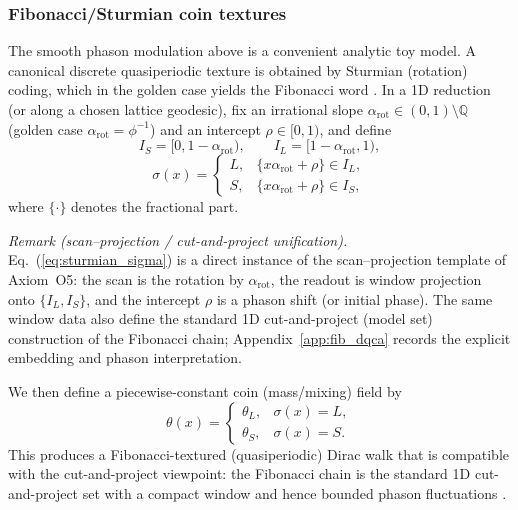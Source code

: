\subsubsection{Fibonacci/Sturmian coin textures}
The smooth phason modulation above is a convenient analytic toy model. A canonical discrete quasiperiodic texture is obtained by Sturmian (rotation) coding, which in the golden case yields the Fibonacci word \cite{MorseHedlund1940,Lothaire2002}. In a 1D reduction (or along a chosen lattice geodesic), fix an irrational slope $\alpha_{\mathrm{rot}}\in(0,1)\setminus\mathbb{Q}$ (golden case $\alpha_{\mathrm{rot}}=\phi^{-1}$) and an intercept $\rho\in[0,1)$, and define
\begin{equation}
    I_S=[0,1-\alpha_{\mathrm{rot}}),\qquad I_L=[1-\alpha_{\mathrm{rot}},1),
\end{equation}
\begin{equation}
    \sigma(x)=
    \begin{cases}
    L,& \{x\alpha_{\mathrm{rot}}+\rho\}\in I_L,\\
    S,& \{x\alpha_{\mathrm{rot}}+\rho\}\in I_S,
    \end{cases}
\label{eq:sturmian_sigma}
\end{equation}
where $\{\cdot\}$ denotes the fractional part.\par
\noindent\textit{Remark (scan--projection / cut-and-project unification).} Eq.~(\ref{eq:sturmian_sigma}) is a direct instance of the scan--projection template of Axiom~O5: the scan is the rotation by $\alpha_{\mathrm{rot}}$, the readout is window projection onto $\{I_L,I_S\}$, and the intercept $\rho$ is a phason shift (or initial phase). The same window data also define the standard 1D cut-and-project (model set) construction of the Fibonacci chain; Appendix~\ref{app:fib_dqca} records the explicit embedding and phason interpretation.\par
We then define a piecewise-constant coin (mass/mixing) field by
\begin{equation}
    \theta(x)=
    \begin{cases}
    \theta_L,& \sigma(x)=L,\\
    \theta_S,& \sigma(x)=S.
    \end{cases}
\end{equation}
This produces a Fibonacci-textured (quasiperiodic) Dirac walk that is compatible with the cut-and-project viewpoint: the Fibonacci chain is the standard 1D cut-and-project set with a compact window and hence bounded phason fluctuations \cite{Senechal1995,BaakeGrimm2013AperiodicOrder}.


